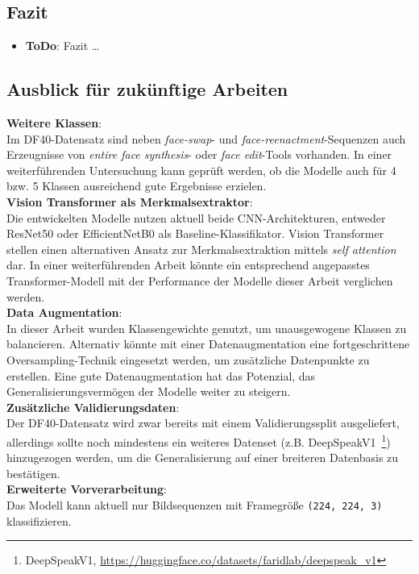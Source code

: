 \documentclass{article}
\newcommand{\imgsize}{\texttt{(224, 224, 3)}\xspace}
\newcommand{\resnet}{ResNet50\xspace}
\newcommand{\effnet}{EfficientNetB0\xspace}
\begin{document}
\subsection{Fazit}
\begin{itemize}
    \item \textbf{ToDo}: Fazit \dots
\end{itemize}

\subsection{Ausblick für zukünftige Arbeiten}
\textbf{Weitere Klassen}:\\
Im DF40-Datensatz sind neben \textit{face-swap}- und \textit{face-reenactment}-Sequenzen auch Erzeugnisse von \textit{entire face synthesis}- oder \textit{face edit}-Tools vorhanden.
In einer weiterführenden Untersuchung kann geprüft werden, ob die Modelle auch für 4 bzw. 5 Klassen ausreichend gute Ergebnisse erzielen.
\\[0.5em]
\textbf{Vision Transformer als Merkmalsextraktor}:\\
Die entwickelten Modelle nutzen aktuell beide CNN-Architekturen, entweder \resnet oder \effnet als Baseline-Klassifikator.
Vision Transformer stellen einen alternativen Ansatz zur Merkmalsextraktion mittels \textit{self attention} dar.
In einer weiterführenden Arbeit könnte ein entsprechend angepasstes Transformer-Modell mit der Performance der Modelle dieser Arbeit verglichen werden.  
\\[0.5em]
\textbf{Data Augmentation}:\\
In dieser Arbeit wurden Klassengewichte genutzt, um unausgewogene Klassen zu balancieren.
Alternativ könnte mit einer Datenaugmentation eine fortgeschrittene Oversampling-Technik eingesetzt werden, um zusätzliche Datenpunkte zu erstellen.
Eine gute Datenaugmentation hat das Potenzial, das Generalisierungsvermögen der Modelle weiter zu steigern.
\\[0.5em]
\textbf{Zusätzliche Validierungsdaten}:\\
Der DF40-Datensatz wird zwar bereits mit einem Validierungssplit ausgeliefert, allerdings sollte noch mindestens ein weiteres Datenset (z.B. DeepSpeakV1~\footnote{DeepSpeakV1, \url{https://huggingface.co/datasets/faridlab/deepspeak_v1}}) hinzugezogen werden, um die Generalisierung auf einer breiteren Datenbasis zu bestätigen.
\\[0.5em]
\textbf{Erweiterte Vorverarbeitung}:\\
Das Modell kann aktuell nur Bildsequenzen mit Framegröße \imgsize klassifizieren.
\end{document}
